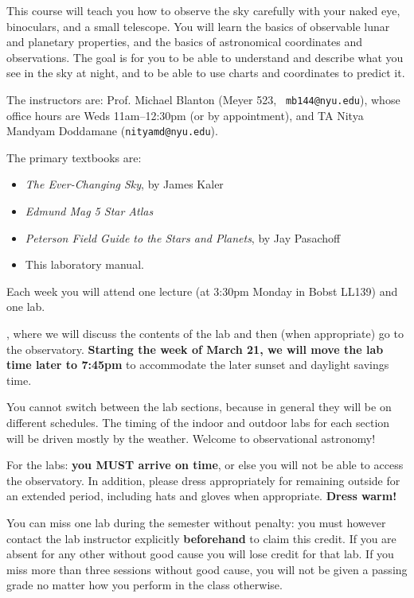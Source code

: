 
\noindent This course will teach you how to observe the sky carefully  
with your naked eye, binoculars, and a small telescope. You will learn
the basics of observable lunar and planetary properties, and the
basics of astronomical coordinates and observations. The goal is for
you to be able to understand and describe what you see in the sky at
night, and to be able to use charts and coordinates to predict it.

\noindent The instructors are: Prof. Michael Blanton (Meyer 523, {\tt
  mb144@nyu.edu}), whose office hours are Weds 11am--12:30pm (or by
appointment), and TA Nitya Mandyam Doddamane ({\tt nityamd@nyu.edu}).
 
\noindent The primary textbooks are: 
\begin{itemize}
\item {\it The Ever-Changing Sky}, by James Kaler
\item {\it Edmund Mag 5 Star Atlas} 
\item {\it Peterson Field Guide to the Stars and Planets}, by Jay
Pasachoff
\item This laboratory manual. 
\end{itemize}

\noindent Each week you will attend one lecture (at 3:30pm Monday in
Bobst LL139) and one lab. 

, where
we will discuss the contents of the lab and then (when appropriate) go
to the observatory. {\bf Starting the week of March 21, we will move
the lab time later to 7:45pm} to accommodate the later sunset and
daylight savings time.

\noindent You cannot switch between the lab sections, because in
general they will be on different schedules.  The timing of the indoor
and outdoor labs for each section will be driven mostly by the
weather. Welcome to observational astronomy!

\noindent For the labs: {\bf you MUST arrive on time}, or else you will not
be able to access the observatory.  In addition, please dress
appropriately for remaining outside for an extended period, including
hats and gloves when appropriate.  {\bf Dress warm!}

  You can miss one lab
during the semester without penalty: you must however contact the lab
instructor explicitly {\bf beforehand} to claim this credit. If you
are absent for any other without good cause you will lose credit for
that lab.  If you miss more than three sessions without good cause,
you will not be given a passing grade no matter how you perform in the
class otherwise.

